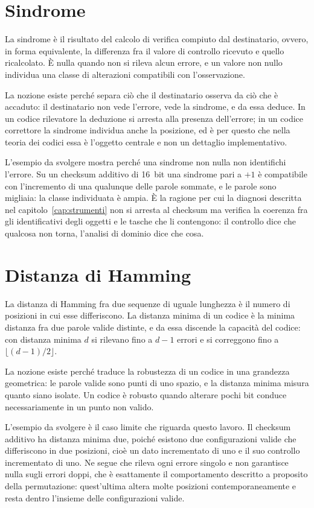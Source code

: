 \section{Sindrome}

La sindrome è il risultato del calcolo di verifica compiuto dal destinatario, ovvero, in forma equivalente, la differenza fra il valore di controllo ricevuto e quello ricalcolato. È nulla quando non si rileva alcun errore, e un valore non nullo individua una classe di alterazioni compatibili con l'osservazione.

La nozione esiste perché separa ciò che il destinatario osserva da ciò che è accaduto: il destinatario non vede l'errore, vede la sindrome, e da essa deduce. In un codice rilevatore la deduzione si arresta alla presenza dell'errore; in un codice correttore la sindrome individua anche la posizione, ed è per questo che nella teoria dei codici essa è l'oggetto centrale e non un dettaglio implementativo.

L'esempio da svolgere mostra perché una sindrome non nulla non identifichi l'errore. Su un checksum additivo di \SI{16}{bit} una sindrome pari a $+1$ è compatibile con l'incremento di una qualunque delle parole sommate, e le parole sono migliaia: la classe individuata è ampia. È la ragione per cui la diagnosi descritta nel capitolo~\ref{cap:strumenti} non si arresta al checksum ma verifica la coerenza fra gli identificativi degli oggetti e le tasche che li contengono: il controllo dice che qualcosa non torna, l'analisi di dominio dice che cosa.

\section{Distanza di Hamming}

La distanza di Hamming fra due sequenze di uguale lunghezza è il numero di posizioni in cui esse differiscono. La distanza minima di un codice è la minima distanza fra due parole valide distinte, e da essa discende la capacità del codice: con distanza minima $d$ si rilevano fino a $d-1$ errori e si correggono fino a $\lfloor (d-1)/2 \rfloor$.

La nozione esiste perché traduce la robustezza di un codice in una grandezza geometrica: le parole valide sono punti di uno spazio, e la distanza minima misura quanto siano isolate. Un codice è robusto quando alterare pochi bit conduce necessariamente in un punto non valido.

L'esempio da svolgere è il caso limite che riguarda questo lavoro. Il checksum additivo ha distanza minima due, poiché esistono due configurazioni valide che differiscono in due posizioni, cioè un dato incrementato di uno e il suo controllo incrementato di uno. Ne segue che rileva ogni errore singolo e non garantisce nulla sugli errori doppi, che è esattamente il comportamento descritto a proposito della permutazione: quest'ultima altera molte posizioni contemporaneamente e resta dentro l'insieme delle configurazioni valide.

